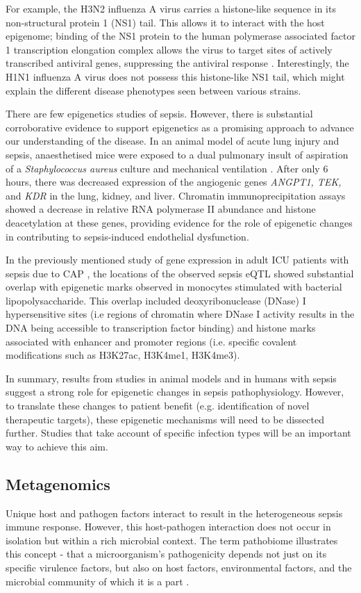 For example, the H3N2 influenza A virus carries a histone-like sequence in its non-structural protein 1 (NS1) tail. This allows it to interact with the host epigenome;   binding of the NS1 protein to the human polymerase associated factor 1 transcription elongation complex allows the virus to target sites of actively transcribed antiviral genes, suppressing the antiviral response \parencite{Marazzi2012}. Interestingly, the H1N1 influenza A virus does not possess this histone-like NS1 tail, which might explain the different disease phenotypes seen between various strains.

There are few epigenetics studies of sepsis. However, there is substantial corroborative evidence to support epigenetics as a promising approach to advance our understanding of the disease. In an animal model of acute lung injury and sepsis, anaesthetised mice were exposed to a dual pulmonary insult of aspiration of a \textit{Staphylococcus aureus} culture and mechanical ventilation \parencite{Bomsztyk2015}. After only 6 hours, there was decreased expression of the angiogenic genes \textit{ANGPT1, TEK,} and \textit{KDR} in the lung, kidney, and liver. Chromatin immunoprecipitation assays showed a decrease in relative RNA polymerase II abundance and histone deacetylation at these genes, providing evidence for the role of epigenetic changes in contributing to sepsis-induced endothelial dysfunction.

In the previously mentioned study of gene expression in adult ICU patients with sepsis due to CAP \parencite{Davenport2016}, the locations of the observed sepsis eQTL showed substantial overlap with epigenetic marks observed in monocytes stimulated with bacterial lipopolysaccharide. This overlap included deoxyribonuclease (DNase) I hypersensitive sites (i.e regions of chromatin where DNase I activity results in the DNA being accessible to transcription factor binding) and histone marks associated with enhancer and promoter regions (i.e. specific covalent modifications such as H3K27ac, H3K4me1, H3K4me3).

In summary, results from studies in animal models and in humans with sepsis suggest a strong role for epigenetic changes in sepsis pathophysiology. However, to translate these changes to patient benefit (e.g. identification of novel therapeutic targets), these epigenetic mechanisms will need to be dissected further. Studies that take account of specific infection types will be an important way to achieve this aim.

\subsection{Metagenomics}
Unique host and pathogen factors interact to result in the heterogeneous sepsis immune response. However, this host-pathogen interaction does not occur in isolation but within a rich microbial context. The term pathobiome illustrates this concept - that a microorganism's pathogenicity depends not just on its specific virulence factors, but also on host factors, environmental factors, and the microbial community of which it is a part \parencite{Vayssier-Taussat2014}. 


